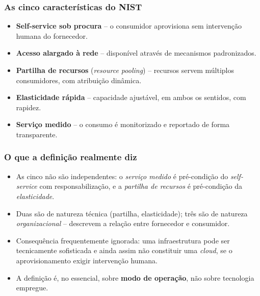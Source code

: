 \documentclass[aspectratio=169]{beamer}
\begin{document}
\begin{frame}
\frametitle{As cinco características do NIST}
\begin{itemize}
    \setlength\itemsep{0.3cm}
    \item \textbf{Self-service sob procura} -- o consumidor aprovisiona sem intervenção humana do fornecedor.
    \item \textbf{Acesso alargado à rede} -- disponível através de mecanismos padronizados.
    \item \textbf{Partilha de recursos} (\emph{resource pooling}) -- recursos servem múltiplos consumidores, com atribuição dinâmica.
    \item \textbf{Elasticidade rápida} -- capacidade ajustável, em ambos os sentidos, com rapidez.
    \item \textbf{Serviço medido} -- o consumo é monitorizado e reportado de forma transparente.
\end{itemize}
\end{frame}

\begin{frame}
\frametitle{O que a definição realmente diz}
\begin{itemize}
    \setlength\itemsep{0.35cm}
    \item As cinco não são independentes: o \emph{serviço medido} é pré-condição do \emph{self-service} com responsabilização, e a \emph{partilha de recursos} é pré-condição da \emph{elasticidade}.
    \item Duas são de natureza técnica (partilha, elasticidade); três são de natureza \emph{organizacional} -- descrevem a relação entre fornecedor e consumidor.
    \item Consequência frequentemente ignorada: uma infraestrutura pode ser tecnicamente sofisticada e ainda assim não constituir uma \emph{cloud}, se o aprovisionamento exigir intervenção humana.
    \item A definição é, no essencial, sobre \textbf{modo de operação}, não sobre tecnologia empregue.
\end{itemize}
\end{frame}
\end{document}
